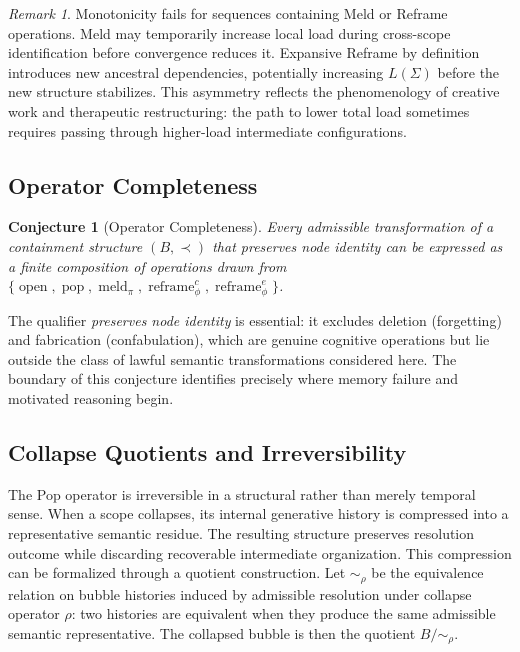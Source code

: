 \documentclass[12pt, a4paper]{article}
\theoremstyle{plain}
\newtheorem{conjecture}[theorem]{Conjecture}
\theoremstyle{definition}
\theoremstyle{remark}
\newtheorem{remark}[theorem]{Remark}
\DeclareMathOperator{\Open}{open}
\DeclareMathOperator{\Pop}{pop}
\DeclareMathOperator{\Meld}{meld}
\DeclareMathOperator{\Reframe}{reframe}
\begin{document}
\begin{remark}
Monotonicity fails for sequences containing Meld or Reframe operations.
Meld may temporarily increase local load during cross-scope identification
before convergence reduces it. Expansive Reframe by definition introduces
new ancestral dependencies, potentially increasing $L(\Sigma)$ before the
new structure stabilizes. This asymmetry reflects the phenomenology of
creative work and therapeutic restructuring: the path to lower total load
sometimes requires passing through higher-load intermediate configurations.
\end{remark}

\subsection{Operator Completeness}

\begin{conjecture}[Operator Completeness]
Every admissible transformation of a containment structure $(B, \prec)$ that
preserves node identity can be expressed as a finite composition of operations
drawn from $\{\Open, \Pop, \Meld_\pi, \Reframe^c_\phi, \Reframe^e_\phi\}$.
\end{conjecture}

The qualifier \emph{preserves node identity} is essential: it excludes
deletion (forgetting) and fabrication (confabulation), which are genuine
cognitive operations but lie outside the class of lawful semantic
transformations considered here. The boundary of this conjecture identifies
precisely where memory failure and motivated reasoning begin.

\subsection{Collapse Quotients and Irreversibility}

The Pop operator is irreversible in a structural rather than merely temporal
sense. When a scope collapses, its internal generative history is compressed
into a representative semantic residue. The resulting structure preserves
resolution outcome while discarding recoverable intermediate organization.
This compression can be formalized through a quotient construction. Let
$\sim_\rho$ be the equivalence relation on bubble histories induced by
admissible resolution under collapse operator $\rho$: two histories are
equivalent when they produce the same admissible semantic representative. The
collapsed bubble is then the quotient $B/{\sim_\rho}$.
\end{document}
